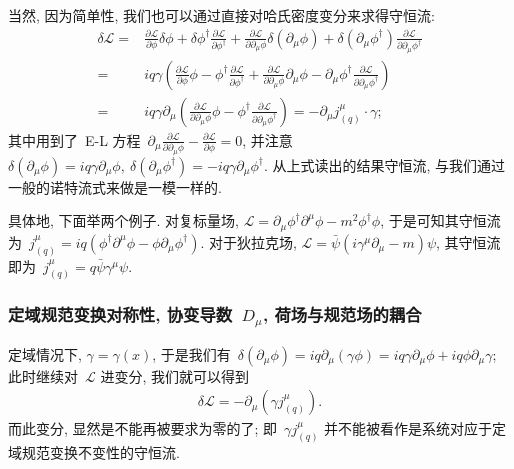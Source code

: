 当然, 因为简单性, 我们也可以通过直接对哈氏密度变分来求得守恒流:
\begin{align}
\delta\mathcal{L}=&\frac{\partial\mathcal{L}}{\partial\phi}\delta\phi+\delta\phi^\dag\frac{\partial\mathcal{L}}{\partial\phi^\dag}
+\frac{\partial\mathcal{L}}{\partial\partial_\mu\phi}\delta(\partial_\mu\phi)+\delta(\partial_\mu\phi^\dag)\frac{\partial\mathcal{L}}{\partial\partial_\mu\phi^\dag}\nonumber\\
=&iq\gamma\left(\frac{\partial\mathcal{L}}{\partial\phi}\phi-\phi^\dag\frac{\partial\mathcal{L}}{\partial\phi^\dag}
+\frac{\partial\mathcal{L}}{\partial\partial_\mu\phi}\partial_\mu\phi-\partial_\mu\phi^\dag\frac{\partial\mathcal{L}}{\partial\partial_\mu\phi^\dag}\right)\nonumber\\
=&iq\gamma\partial_\mu\left(\frac{\partial\mathcal{L}}{\partial\partial_\mu\phi}\phi-\phi^\dag\frac{\partial\mathcal{L}}{\partial\partial_\mu\phi^\dag}\right)
=-\partial_\mu j^\mu_{(q)}\cdot\gamma;\label{haha}
\end{align}
其中用到了~E-L 方程~$\partial_\mu\frac{\partial\mathcal{L}}{\partial\partial_\mu\phi}-\frac{\partial\mathcal{L}}{\partial\phi}=0$, 并注意~$\delta(\partial_\mu\phi)=iq\gamma\partial_\mu\phi,~\delta(\partial_\mu\phi^\dag)=-iq\gamma\partial_\mu\phi^\dag$. 从上式读出的结果守恒流, 与我们通过一般的诺特流式来做是一模一样的.

具体地, 下面举两个例子. 对复标量场, $\mathcal{L}=\partial_\mu\phi^\dag\partial^\mu\phi-m^2\phi^\dag\phi$, 于是可知其守恒流为~$j^\mu_{(q)}=iq(\phi^\dag\partial^\mu\phi-\phi\partial_\mu\phi^\dag)$. 对于狄拉克场, $\mathcal{L}=\bar{\psi}(i\gamma^\mu\partial_\mu-m)\psi$, 其守恒流即为~$j^\mu_{(q)}=q\bar{\psi}\gamma^\mu\psi$.






\subsubsection{定域规范变换对称性, 协变导数~$D_\mu$, 荷场与规范场的耦合}


定域情况下, $\gamma=\gamma(x)$, 于是我们有~$\delta(\partial_\mu\phi)=iq\partial_\mu(\gamma\phi)=iq\gamma\partial_\mu\phi+iq\phi\partial_\mu\gamma$; 此时继续对~$\mathcal{L}$ 进变分, 我们就可以得到
\begin{align}
\delta\mathcal{L}=-\partial_\mu \left(\gamma j^\mu_{(q)}\right).
\end{align}
而此变分, 显然是不能再被要求为零的了; 即~$\gamma j^\mu_{(q)}$ 并不能被看作是系统对应于定域规范变换不变性的守恒流. %


